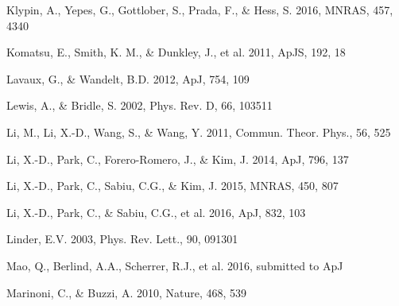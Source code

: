 \documentclass[iop]{emulateapj}
\begin{document}
\begin{thebibliography}{}
Klypin, A., Yepes, G., Gottlober, S., Prada, F., \& Hess, S. 2016,
MNRAS, 457, 4340%

Komatsu, E., Smith, K. M., \& Dunkley, J., et al. 2011, ApJS, 192, 18  





Lavaux, G., \& Wandelt, B.D. 2012, ApJ, 754, 109  


Lewis, A., \& Bridle, S. 2002, Phys. Rev. D, 66, 103511


Li, M., Li, X.-D., Wang, S., \& Wang, Y. 2011, Commun. Theor. Phys., 56, 525

Li, X.-D., Park, C., Forero-Romero, J., \& Kim, J. 2014, ApJ, 796, 137

Li, X.-D., Park, C., Sabiu, C.G., \& Kim, J. 2015, MNRAS, 450, 807 

%
Li, X.-D., Park, C., \& Sabiu, C.G., et al. 2016, ApJ, 832, 103

Linder, E.V. 2003, Phys. Rev. Lett., 90, 091301



Mao, Q., Berlind, A.A., Scherrer, R.J., et al. 2016, submitted to ApJ

Marinoni, C., \& Buzzi, A. 2010, Nature, 468, 539  


\end{thebibliography}
\end{document}
